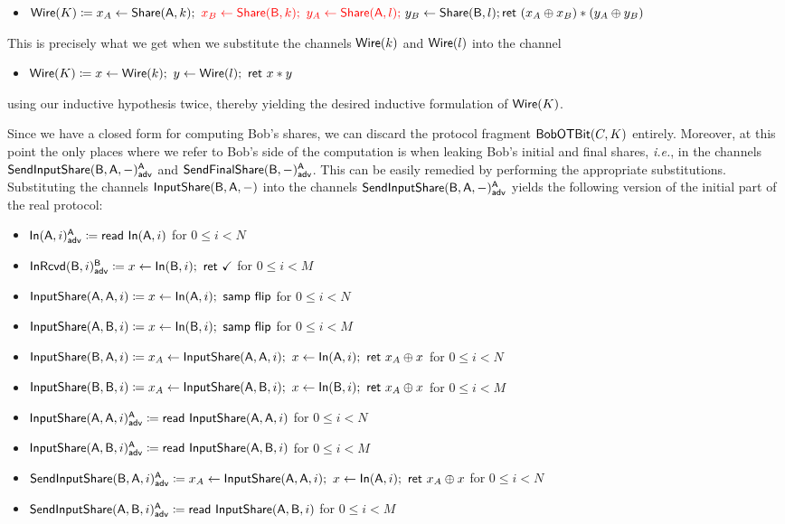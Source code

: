 \begin{itemize}
\begin{itemize}
\item $\mathsf{Wire}(K) \coloneqq x_A \leftarrow \mathsf{Share}(\mathsf{A},k); \ {\color{red} x_B \leftarrow \mathsf{Share}(\mathsf{B},k); \ y_A \leftarrow \mathsf{Share}(\mathsf{A},l); \ } y_B \leftarrow \mathsf{Share}(\mathsf{B},l); \\ \mathsf{ret} \ (x_A \oplus x_B) * (y_A \oplus y_B)$
\end{itemize}
This is precisely what we get when we substitute the channels $\mathsf{Wire}(k)$ and $\mathsf{Wire}(l)$ into the channel
\begin{itemize}
\item $\mathsf{Wire}(K) \coloneqq x \leftarrow \mathsf{Wire}(k); \ y \leftarrow \mathsf{Wire}(l); \ \mathsf{ret} \ x * y$
\end{itemize}
using our inductive hypothesis twice, thereby yielding the desired inductive formulation of $\mathsf{Wire}(K)$.
\end{itemize}

\noindent Since we have a closed form for computing Bob's shares, we can discard the protocol fragment $\mathsf{BobOTBit}(C,K)$ entirely. Moreover, at this point the only places where we refer to Bob's side of the computation is when leaking Bob's initial and final shares, \emph{i.e.}, in the channels $\mathsf{SendInputShare}(\mathsf{B},\mathsf{A},-)^{\mathsf{A}}_{\mathsf{adv}}$ and $\mathsf{SendFinalShare}(\mathsf{B},-)^{\mathsf{A}}_{\mathsf{adv}}$. This can be easily remedied by performing the appropriate substitutions. Substituting the channels $\mathsf{InputShare}(\mathsf{B},\mathsf{A},-)$ into the channels $\mathsf{SendInputShare}(\mathsf{B},\mathsf{A},-)^{\mathsf{A}}_{\mathsf{adv}}$ yields the following version of the initial part of the real protocol:

\begin{itemize}
\item {\color{blue} $\mathsf{In}(\mathsf{A},i)^{\mathsf{A}}_{\mathsf{adv}} \coloneqq \mathsf{read} \ \mathsf{In}(\mathsf{A},i)$ for $0 \leq i < N$}
\item {\color{blue} $\mathsf{InRcvd}(\mathsf{B},i)^{\mathsf{B}}_{\mathsf{adv}} \coloneqq x \leftarrow \mathsf{In}(\mathsf{B},i); \ \mathsf{ret} \ \checkmark$ for $0 \leq i < M$}\smallskip
\item $\mathsf{InputShare}(\mathsf{A},\mathsf{A},i) \coloneqq x \leftarrow \mathsf{In}(\mathsf{A},i); \ \mathsf{samp} \ \mathsf{flip}$ for $0 \leq i < N$
\item $\mathsf{InputShare}(\mathsf{A},\mathsf{B},i) \coloneqq x \leftarrow \mathsf{In}(\mathsf{B},i); \ \mathsf{samp} \ \mathsf{flip}$ for $0 \leq i < M$
\item $\mathsf{InputShare}(\mathsf{B},\mathsf{A},i) \coloneqq x_A \leftarrow \mathsf{InputShare}(\mathsf{A},\mathsf{A},i); \ x \leftarrow \mathsf{In}(\mathsf{A},i); \ \mathsf{ret} \ x_A \oplus x$ for $0 \leq i < N$
\item $\mathsf{InputShare}(\mathsf{B},\mathsf{B},i) \coloneqq x_A \leftarrow \mathsf{InputShare}(\mathsf{A},\mathsf{B},i); \ x \leftarrow \mathsf{In}(\mathsf{B},i); \  \mathsf{ret} \ x_A \oplus x$ for $0 \leq i < M$\smallskip
\item {\color{blue} $\mathsf{InputShare}(\mathsf{A},\mathsf{A},i)^{\mathsf{A}}_{\mathsf{adv}} \coloneqq \mathsf{read} \ \mathsf{InputShare}(\mathsf{A},\mathsf{A},i)$ for $0 \leq i < N$}
\item {\color{blue} $\mathsf{InputShare}(\mathsf{A},\mathsf{B},i)^{\mathsf{A}}_{\mathsf{adv}} \coloneqq \mathsf{read} \ \mathsf{InputShare}(\mathsf{A},\mathsf{B},i)$ for $0 \leq i < M$}\smallskip
\item {\color{blue} $\mathsf{SendInputShare}(\mathsf{B},\mathsf{A},i)^{\mathsf{A}}_{\mathsf{adv}} \coloneqq x_A \leftarrow \mathsf{InputShare}(\mathsf{A},\mathsf{A},i); \ x \leftarrow \mathsf{In}(\mathsf{A},i); \ \mathsf{ret} \ x_A \oplus x$ for $0 \leq i < N$}
\item {\color{blue} $\mathsf{SendInputShare}(\mathsf{A},\mathsf{B},i)^{\mathsf{A}}_{\mathsf{adv}} \coloneqq \mathsf{read} \ \mathsf{InputShare}(\mathsf{A},\mathsf{B},i)$ for $0 \leq i < M$}
\end{itemize}

